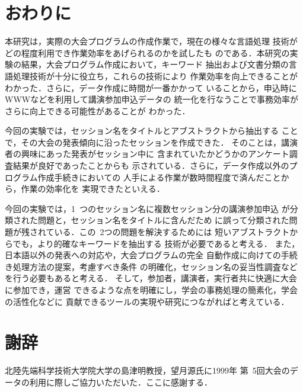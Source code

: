 \section{おわりに}
本研究は，実際の大会プログラムの作成作業で，現在の様々な言語処理
技術がどの程度利用でき作業効率をあげられるのかを試したも
のである．本研究の実験の結果，大会プログラム作成において，キーワード
抽出および文書分類の言語処理技術が十分に役立ち，これらの技術により
作業効率を向上できることがわかった．さらに，データ作成に時間が一番かかって
いることから，申込時にWWWなどを利用して講演参加申込データの
統一化を行なうことで事務効率がさらに向上できる可能性があることが
わかった．

今回の実験では，セッション名をタイトルとアブストラクトから抽出する
ことで，その大会の発表傾向に沿ったセッションを作成できた．
そのことは，講演者の興味にあった発表がセッション中に
含まれていたかどうかのアンケート調査結果が良好であったことからも
示されている．さらに，データ作成以外のプログラム作成手続きにおいての
人手による作業が数時間程度で済んだことから，作業の効率化を
実現できたといえる．

今回の実験では，1\ つのセッション名に複数セッション分の講演参加申込
が分類された問題と，セッション名をタイトルに含んだため
に誤って分類された問題が残されている．この\ 2つの問題を解決するためには
短いアブストラクトからでも，より的確なキーワードを抽出する
技術が必要であると考える．
また，日本語以外の発表への対応や，大会プログラムの完全
自動作成に向けての手続き処理方法の提案，考慮すべき条件
の明確化，セッション名の妥当性調査などを行う必要もあると考える．
そして，参加者，講演者，実行者共に快適に大会に参加でき，運営
できるような点を明確にし，学会の事務処理の簡素化，学会の活性化などに
貢献できるツールの実現や研究につながればと考えている．

\section*{謝辞}
北陸先端科学技術大学院大学の島津明教授，望月源氏に1999年
第\ 5回大会のデータの利用に際しご協力いただいた．ここに感謝する．




